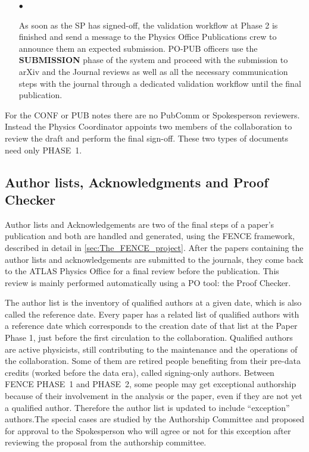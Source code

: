 \begin{itemize}
    \item[\tiny$\bullet$]
    
As soon as the SP has signed-off, the validation workflow at Phase 2 is finished and send a message to the Physics Office Publications crew to announce them an expected submission. PO-PUB officers use the \textbf{SUBMISSION} phase of the system and proceed with the submission to arXiv and the Journal reviews as well as all the necessary communication steps with the journal through a dedicated validation workflow until the final publication.

\end{itemize}

For the CONF or PUB notes there are no PubComm or Spokesperson reviewers. Instead the Physics Coordinator appoints two members of the collaboration to review the draft and perform the final sign-off. These two types of documents need only PHASE~1.


\subsection{Author lists, Acknowledgments and Proof Checker}%
\label{sec:Authorlists_acknowledgments_and_ProofChecker}

Author lists and Acknowledgements are two of the final steps of a paper’s publication and both are handled and generated, using the FENCE framework, described in detail in \cref{sec:The_FENCE_project}.
After the papers containing the author lists and acknowledgements are submitted to the journals,
they come back to the ATLAS Physics Office for a final review before the publication.
This review is mainly performed automatically using a PO tool: the Proof Checker.

The author list is the inventory of qualified authors at a given date, which is also called the reference date. Every paper has a related list of qualified authors with a reference date which corresponds to the creation date of that list at the Paper Phase 1, just before the first circulation to the collaboration. Qualified authors are active physicists, still contributing to the maintenance and the operations of the collaboration.
Some of them are retired people benefiting from their pre-data credits (worked before the data era), called signing-only authors.
Between FENCE PHASE~1 and PHASE~2, some people may get exceptional authorship because of their involvement in the analysis or the paper,
even if they are not yet a qualified author.
Therefore the author list is updated to include \enquote{exception} authors.The special cases are studied by the Authorship Committee and proposed for approval to the Spokesperson who will agree or not for this exception after reviewing the proposal from the authorship committee.

